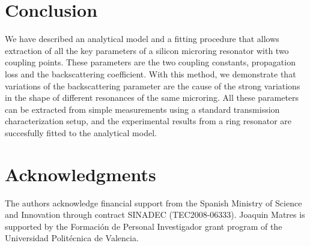 \documentclass[10pt,letterpaper]{article}
\begin{document}


\section{Conclusion}
We have described an analytical model and a fitting procedure that allows extraction of all the key parameters of a silicon microring resonator with two coupling points. These parameters are the two coupling constants, propagation loss and the backscattering coefficient. With this method, we demonstrate that variations of the backscattering parameter are the cause of the strong variations in the shape of different resonances of the same microring. All these parameters can be extracted from simple measurements using a standard transmission characterization setup, and the experimental results from a ring resonator are succesfully fitted to the analytical model.


\section*{Acknowledgments}


The authors acknowledge financial support from the Spanish Ministry of Science and Innovation through contract SINADEC (TEC2008-06333). Joaquin Matres is supported by the Formaci\'on de Personal Investigador grant program of the Universidad Politécnica de Valencia.
\end{document}
